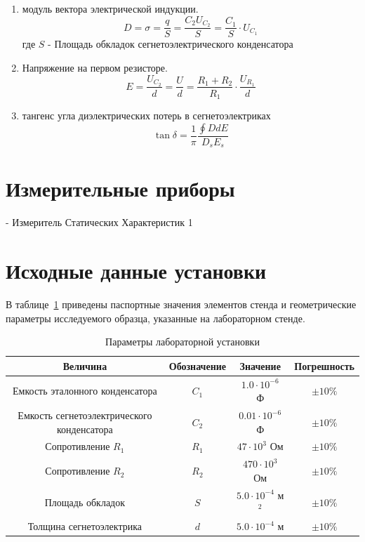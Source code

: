 \documentclass[a4paper,14pt]{article}
\begin{document}
    \begin{enumerate}
        \item модуль вектора электрической индукции.
        \begin{equation}
            D = \sigma = \frac{q}{S} = \frac{C_2U_{C_2}}{S} = \frac{C_1}{S}\cdot U_{C_1}
        \end{equation}
        где \(S\) -  Площадь обкладок сегнетоэлектрического конденсатора

        \item Напряжение на первом резисторе.
        \begin{equation}
           E = \frac{U_{C_2}}{d} = \frac{U}{d} = \frac{R_1 + R_2}{R_1}\cdot\frac{U_{R_1}}{d}
        \end{equation}


        \item тангенс угла диэлектрических потерь в сегнетоэлектриках
        \begin{equation}
            \tan \delta = \frac{1}{\pi}\frac{\oint DdE}{D_sE_s}
        \end{equation}

    \end{enumerate}

    \section{Измерительные приборы}

    - Измеритель Статических Характеристик 1
    \newpage
    \section{Исходные данные установки}

В таблице~\ref{tab:init_data} приведены паспортные значения элементов стенда и геометрические параметры исследуемого образца, указанные на лабораторном стенде.

\begin{table}[h!]
\centering
\caption{Параметры лабораторной установки}
\label{tab:init_data}
\begin{tabular}{|c|c|c|c|}
\hline
\textbf{Величина} & \textbf{Обозначение} & \textbf{Значение} & \textbf{Погрешность} \\
\hline
Емкость эталонного конденсатора & \(C_1\) & \(1.0 \cdot 10^{-6}\) Ф & \(\pm 10\%\) \\
\hline
Емкость сегнетоэлектрического конденсатора & \(C_2\) & \(0.01 \cdot 10^{-6}\) Ф & \(\pm 10\%\) \\
\hline
Сопротивление \(R_1\) & \(R_1\) & \(47 \cdot 10^{3}\) Ом & \(\pm 10\%\) \\
\hline
Сопротивление \(R_2\) & \(R_2\) & \(470 \cdot 10^{3}\) Ом & \(\pm 10\%\) \\
\hline
Площадь обкладок & \(S\) & \(5.0 \cdot 10^{-4}\) м\(^2\) & \(\pm 10\%\) \\
\hline
Толщина сегнетоэлектрика & \(d\) & \(5.0 \cdot 10^{-4}\) м & \(\pm 10\%\) \\
\hline
\end{tabular}
\end{table}
\end{document}
